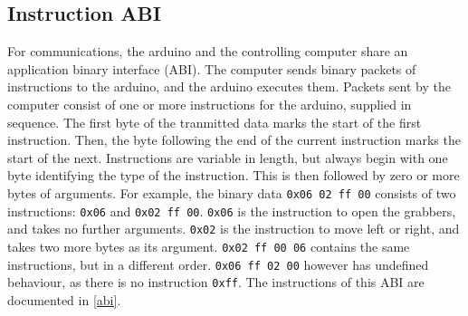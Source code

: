 \subsection{Instruction ABI}

For communications, the arduino and the controlling computer share an application binary
interface (ABI). The computer sends binary packets of instructions to the
arduino, and the arduino executes them. Packets sent by the computer consist
of one or more instructions for the arduino, supplied in sequence. The first
byte of the tranmitted data marks the start of the first instruction. Then, the
byte following the end of the current instruction marks the start of the next.
Instructions are variable in length, but always begin with one byte identifying
the type of the instruction. This is then followed by zero or more bytes of
arguments. For example, the binary data \texttt{0x06 02 ff 00} consists of two
instructions: \texttt{0x06} and \texttt{0x02 ff 00}. \texttt{0x06} is the
instruction to open the grabbers, and takes no further arguments. \texttt{0x02}
is the instruction to move left or right, and takes two more bytes as its
argument. \texttt{0x02 ff 00 06} contains the same instructions, but in a
different order. \texttt{0x06 ff 02 00} however has undefined behaviour, as
there is no instruction \texttt{0xff}. The instructions of this ABI are
documented in \autoref{abi}.
